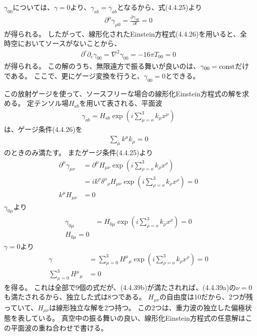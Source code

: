 \documentclass[a4paper]{jsarticle}
\newcommand{\pdif}[2]{\frac{\partial #1}{\partial #2}}
\begin{document}
$\gamma_{00}$については、$\gamma=0$より、$\gamma_{ab} = \overline{\gamma}_{ab}$となるから、式(4.4.25)より
\begin{align}
	\partial^{\mu} \gamma_{\mu 0} = \pdif{\gamma_{00}}{t} = 0 \tag{4.4.35}
\end{align}
が得られる。
したがって、線形化されたEinstein方程式(4.4.26)を用いると、全時空においてソースがないことから、
\begin{align}
	\partial^c \partial_c \gamma_{00} = \nabla^2 \gamma_{00} = -16 \pi T_{00} = 0 \tag{4.4.36}
\end{align}
が得られる。
この解のうち、無限遠方で振る舞いが良いのは、$\gamma_{00} = {\rm const}$だけである。
ここで、更にゲージ変換を行うと、$\gamma_{00}=0$とできる。

この放射ゲージを使って、ソースフリーな場合の線形化Einstein方程式の解を求める。
定テンソル場$H_{ab}$を用いて表される、平面波
\begin{align}
	\gamma_{ab} = H_{ab} \exp \left( i \sum_{\mu = o}^3 k_{\mu} x^{\mu} \right)
\end{align}
は、ゲージ条件(4.4.26)を
\begin{align}
	\sum_{\mu} k^{\mu} k_{\mu} = 0
\end{align}
のときのみ満たす。
またゲージ条件(4.4.25)より
\begin{align}
	\partial^{\mu} \gamma_{\mu\nu} &= \partial^{\mu} H_{\mu\nu} \exp \left( i \sum_{\rho = o}^3 k_{\rho} x^{\rho} \right) \\
	&= i k^{\rho} {\delta^{\mu}}_{\rho} H_{\mu\nu} \exp \left( i \sum_{\rho = o}^3 k_{\rho} x^{\rho} \right) = 0 \\
	k^{\mu} H_{\mu\nu} &= 0 \tag{4.4.39a}
\end{align}
$\gamma_{0\mu}$より
\begin{align}
	\gamma_{0\mu} &= H_{0\mu} \exp \left( i \sum_{\rho = o}^3 k_{\rho} x^{\rho} \right) = 0 \\
	H_{0\mu} = 0 \tag{4.4.39b}
\end{align}
$\gamma = 0$より
\begin{align}
	\gamma &= \sum_{\mu=0}^3 {H^{\mu}}_{\mu} \exp \left( i \sum_{\rho = o}^3 k_{\rho} x^{\rho} \right) = 0 \\
	\sum_{\mu=0}^3 {H^{\mu}}_{\mu} &= 0 \tag{4.4.39c}
\end{align}
を得る。
これは全部で9個の式だが、(4.4.39b)が満たされれば、(4.4.39a)の$\nu=0$も満たされるから、独立した式は8つである。
$H_{\mu\nu}$の自由度は10だから、2つが残っていて、$H_{\mu\nu}$は線形独立な解を2つ持つ。
この2つは、重力波の独立した偏極状態を表している。
真空中の振る舞いの良い、線形化Einstein方程式の任意解はこの平面波の重ね合わせで書ける。
\end{document}
